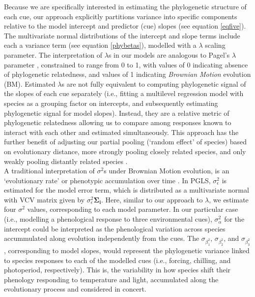 \documentclass[11pt]{article}
\begin{document}
Because we are specifically interested in estimating the phylogenetic structure of each cue, our approach explicitly partitions variance into specific components relative to the model intercept and predictor (cue) slopes (see equation \ref{eqfive}). The multivariate normal distributions of the intercept and slope terms include each a variance term (see equation \ref{phybetas}), modelled with a $\lambda$ scaling parameter. The interpretation of $\lambda$s in our models are analogous to Pagel's $\lambda$  \citep{pagel1999inferring} parameter \citep{housworth2004phylogenetic}, constrained to range from 0 to 1, with values of 0 indicating absence of phylogenetic relatedness, and values of 1 indicating \emph{Brownian Motion} evolution (BM). Estimated $\lambda$s are not fully equivalent to computing phylogenetic signal of the slopes of each cue separately (i.e., fitting a multilevel regression model with species as a grouping factor on intercepts, and subsequently estimating phylogenetic signal for model slopes). Instead, they are a relative metric of phylogenetic relatedness allowing us to compare among responses known to interact with each other and estimated simultaneously. This approach has the further benefit of adjusting our partial pooling (`random effect' of species) based on evolutionary distance, more strongly pooling closely related species, and only weakly pooling distantly related species \citep[see Gaussian process models in][]{BDA}. \\%

A traditional interpretation of $\sigma^2$s under Brownian Motion evolution, is an `evolutionary rate' or phenotypic accumulation over time \citep{revell2008phylogenetic}. In PGLS, $\sigma_\epsilon^2$ is estimated for the model error term, which is distributed as a multivariate normal with VCV matrix given by $\sigma_\epsilon^2$$\boldsymbol{\Sigma_i}$. Here, similar to our approach to $\lambda$, we estimate four $\sigma^2$ values, corresponding to each model parameter. In our particular case (i.e., modelling a phenological response to three environmental cues), $\sigma_\alpha^2$ for the intercept could be interpreted as the phenological variation across species accummulated along evolution independently from the cues. The $\sigma_\beta_1^2$, $\sigma_\beta_2^2$, and $\sigma_\beta_3^2$, corresponding to model slopes, would represent the phylogenetic variance linked to species responses to each of the modelled cues (i.e., forcing, chilling, and photoperiod, respectively). This is, the variability in how species shift their phenology responding to temperature and light, accumulated along the evolutionary process and considered in concert. \\ 
\end{document}
